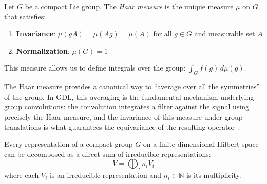 \begin{definition}\label{def:medida_haar_gdl}
Let $G$ be a compact Lie group. The \textit{Haar measure} is the unique measure $\mu$ on $G$ that satisfies:
\begin{enumerate}
    \item \textbf{Invariance}: $\mu(gA) = \mu(Ag) = \mu(A)$ for all $g \in G$ and measurable set $A$
    \item \textbf{Normalization}: $\mu(G) = 1$
\end{enumerate}
This measure allows us to define integrals over the group: $\int_G f(g) \, d\mu(g)$.
\end{definition}

The Haar measure provides a canonical way to ``average over all the symmetries'' of the group. In \gls{GDL}, this averaging is the fundamental mechanism underlying group convolutions: the convolution integrates a filter against the signal using precisely the Haar measure, and the invariance of this measure under group translations is what guarantees the equivariance of the resulting operator \citep{cohen2016groupequivariantconvolutional, kondor2018generalizationconvolutionalneural}.

\begin{theorem}\label{thm:descomposicion_representaciones}
Every representation of a compact group $G$ on a finite-dimensional Hilbert space can be decomposed as a direct sum of irreducible representations:
\begin{equation}
V = \bigoplus_{i} n_i V_i
\end{equation}
where each $V_i$ is an irreducible representation and $n_i \in \mathbb{N}$ is its multiplicity.
\end{theorem}

